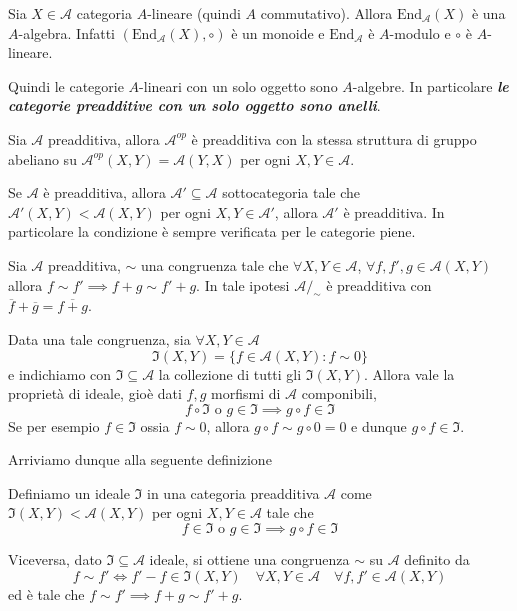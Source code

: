\begin{remark}{}
    Sia \(X \in \mathcal{A}\) categoria \(A\)-lineare (quindi \(A\)
    commutativo). Allora \(\mathrm{End}_\mathcal{A}{(X)}\) è una \(A\)-algebra.
    Infatti \({(\mathrm{End}_{\mathcal{A}} {(X)}, \circ)}\) è un monoide e \(\mathrm{End}_\mathcal{A}\) è \(A\)-modulo e \(\circ\) è \(A\)-lineare.

    Quindi le categorie \(A\)-lineari con un solo oggetto sono \(A\)-algebre. In
    particolare \textbf{\emph{le categorie preadditive con un solo oggetto sono anelli}}.
\end{remark}

\begin{remark}{}
Sia \(\mathcal{A}\) preadditiva, allora \(\mathcal{A}^{op}\) è preadditiva con
la stessa struttura di gruppo abeliano su \(\mathcal{A}^{op}{(X, Y)} = \mathcal{A}{(Y, X)}\) per ogni \(X, Y \in \mathcal{A}\).
\end{remark}

\begin{remark}{}
Se \(\mathcal{A}\) è preadditiva, allora \(\mathcal{A}' \subseteq \mathcal{A}\) sottocategoria tale che \(\mathcal{A}'{(X, Y)} < \mathcal{A}{(X,Y)}\) per ogni \(X, Y \in \mathcal{A}'\), allora \(\mathcal{A}'\) è preadditiva. In particolare la condizione è sempre verificata per le categorie piene.
\end{remark}

    Sia \(\mathcal{A}\) preadditiva, \(\sim \) una congruenza tale che \(\forall X, Y \in \mathcal{A}\), \(\forall f, f', g \in \mathcal{A}{(X, Y)}\) allora \(f \sim f' \implies f + g \sim f' + g\). In tale ipotesi \(\mathcal{A}/_\sim \) è preadditiva con \(\overline{f} + \overline{g} = \overline{f+g}\).

    Data una tale congruenza, sia \(\forall X, Y \in \mathcal{A}\) 
    \[
      \mathfrak{I}{(X,Y)} = \{f \in \mathcal{A}{(X, Y)} : f \sim 0\} 
    \]
    e indichiamo con \(\mathfrak{I} \subseteq \mathcal{A}\) la collezione di
    tutti gli \(\mathfrak{I}{(X, Y)}\). Allora vale la proprietà di ideale, gioè
    dati \(f, g\) morfismi di \(\mathcal{A}\) componibili, 
    \[
      f \circ \mathfrak{I} \text{ o } g \in \mathfrak{I} \implies g \circ f \in \mathfrak{I}
    \]
    Se per esempio \(f \in \mathfrak{I}\) ossia \(f \sim 0\), allora \(g \circ f
    \sim g \circ 0 = 0 \) e dunque \(g \circ f \in \mathfrak{I}\).

    Arriviamo dunque alla seguente definizione

\begin{definition}{}
    Definiamo un ideale \(\mathfrak{I}\) in una categoria preadditiva \(\mathcal{A}\) come \(\mathfrak{I}{(X,Y)} < \mathcal{A}{(X,Y)}\) per ogni \(X, Y \in \mathcal{A}\) tale che
    \[
      f \in \mathfrak{I} \text{ o } g \in \mathfrak{I} \implies g \circ f \in
      \mathfrak{I}
    \]
\end{definition}
Viceversa, dato \(\mathfrak{I} \subseteq \mathcal{A} \) ideale, si ottiene una
congruenza \(\sim \) su \(\mathcal{A}\) definito da 
\[
  f \sim f' \iff f' - f \in \mathfrak{I}{(X, Y)} \quad \forall X, Y \in \mathcal{A} \quad \forall f, f' \in  \mathcal{A}{(X, Y)}
\]
ed è tale che \(f \sim f' \implies f + g \sim f'+ g\).

